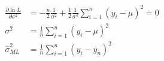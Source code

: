 \documentclass[12pt]{article}
\begin{document}
\begin{align*}
\frac{\partial \ln L }{\partial \sigma^{2} } &=  - \frac{n}{2} \frac{1}{\sigma^{2}}
 + \frac{1}{2}\frac{1}{\sigma^{4}}\sum\limits_{i = 1} ^n (y_{i} - \mu)^{2} = 0\\
 \sigma^{2} &= \frac{1}{n}\sum\limits_{i = 1} ^n (y_{i} - \mu)^{2}	\\
  \widehat{\sigma}_{ML}^{2} &= \frac{1}{n}\sum\limits_{i = 1} ^n (y_{i} -
	\overline{y}_{n})^{2}	\\
\end{align*}





%
%
\end{document}
